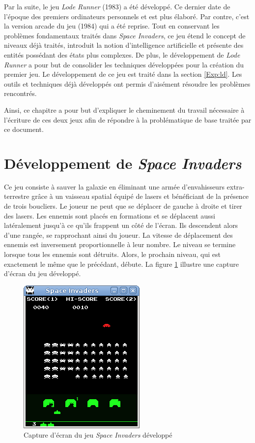 \documentclass[12pt,twoside,letterpaper,francais]{book}
\begin{document}
Par la suite, le jeu \textit{Lode Runner} (1983) a été développé. Ce dernier date de
l'époque des premiers ordinateurs personnels et est plus élaboré. Par
contre, c'est la version arcade du jeu (1984) qui a été reprise. Tout
en conservant les problèmes fondamentaux traités dans \textit{Space Invaders}, ce jeu
étend le concept de niveaux déjà traités, introduit la notion
d'intelligence artificielle et présente des entités possédant des
états plus complexes. De plus, le dévelop\-pement de \textit{Lode Runner} a pour but de
consolider les techniques développées pour la création du premier
jeu. Le dévelop\-pement de ce jeu est traité dans la section
\ref{Exp:ld}.  Les outils et techniques déjà développés ont permis
d'aisément résoudre les problèmes rencontrés.

Ainsi, ce chapitre a pour but d'expliquer le cheminement du travail
nécessaire à l'écriture de ces deux jeux afin de répondre à la
problématique de base traitée par ce document.


\FloatBarrier
\section{Dévelop\-pement de \textit{Space Invaders}} \label{Exp:SI}
Ce jeu consiste à \og sauver la galaxie \fg en éliminant une armée
d'envahisseurs extra-terrestre grâce à un vaisseau spatial équipé de
lasers et bénéficiant de la présence de trois boucliers. Le joueur ne
peut que se déplacer de gauche à droite et tirer des lasers. Les
ennemis sont placés en formations et se déplacent aussi latéralement
jusqu'à ce qu'ils frappent un côté de l'écran. Ils descendent alors
d'une rangée, se rapprochant ainsi du joueur. La vitesse de
déplacement des ennemis est inversement proportionnelle à leur
nombre. Le niveau se termine lorsque tous les ennemis sont
détruits. Alors, le prochain niveau, qui est exactement le même que le
précédant, débute. La figure \ref{Exp:si-screen} illustre une capture
d'écran du jeu développé.\\

\begin{figure}[htb!]
  \center
  \includegraphics[scale=0.7]{space-invaders-screenshot}
  \caption{Capture d'écran du jeu \textit{Space Invaders} développé}
  \label{Exp:si-screen}
\end{figure}
\end{document}
